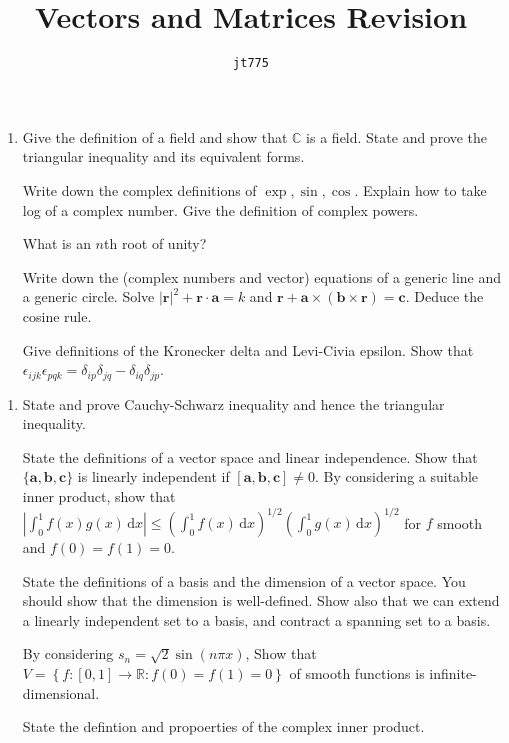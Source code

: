 \documentclass[11pt]{article}
\title{\textbf{Vectors and Matrices Revision}}
\author{\texttt{jt775}}
\date{\null}
\newcommand{\bbC}{\mathbb{C}}
\newlength{\qspace}
\newcounter{qnumber}
\newenvironment{question}%
 {\vspace{\qspace}
  \begin{enumerate}[\bfseries 1\quad][10]%
    \setcounter{enumi}{\value{qnumber}}%
    \item%
 }
{
  \end{enumerate}
  \filbreak
  \stepcounter{qnumber}
 }
\def\le{\leqslant}
\begin{document}
\maketitle
\vspace{-1.5cm}
\begin{question}
    Give the definition of a field and show that $\bbC$ is a field. State and prove the triangular inequality and its equivalent forms.

    Write down the complex definitions of $ \exp, \sin, \cos $. Explain how to take log of a complex number. Give the definition of complex powers.

    What is an $n$th root of unity?

    Write down the (complex numbers and vector) equations of a generic line and a generic circle. Solve $ |\mathbf{r}|^2+\mathbf{r}\cdot \mathbf{a}=k $ and $ \mathbf{r}+\mathbf{a} \times (\mathbf{b}\times \mathbf{r}) =\mathbf{c} $. Deduce the cosine rule.

    Give definitions of the Kronecker delta and Levi-Civia epsilon. Show that $ \epsilon_{ijk}\epsilon_{pqk}= \delta_{ip}\delta_{jq}-\delta_{iq}\delta_{jp}$.
\end{question}
\begin{question}
  State and prove Cauchy-Schwarz inequality and hence the triangular inequality.

  State the definitions of a vector space and linear independence. Show that $ \{\mathbf{a},\mathbf{b},\mathbf{c}\} $ is linearly independent if $ [\mathbf{a},\mathbf{b},\mathbf{c}]\neq 0 $. By considering a suitable inner product, show that $ \left| \int_{0}^{1} f(x)g(x) \,\mathrm{d}x \right| \le \left( \int_{0}^{1} f(x) \,\mathrm{d}x \right)^{1/2}\left( \int_{0}^{1} g(x) \,\mathrm{d}x \right)^{1/2} $ for $f$ smooth and $ f(0)=f(1)=0 $.

  State the definitions of a basis and the dimension of a vector space. You should show that the dimension is well-defined. Show also that we can extend a linearly independent set to a basis, and contract a spanning set to a basis. 
  
  By considering $ s_n=\sqrt{2} \sin (n \pi x) $, Show that $ V=\left\{ f:[0,1] \to \mathbb{R} :f(0)=f(1)=0\right\} $ of smooth functions is infinite-dimensional.

  State the defintion and propoerties of the complex inner product.
\end{question}
\end{document}
